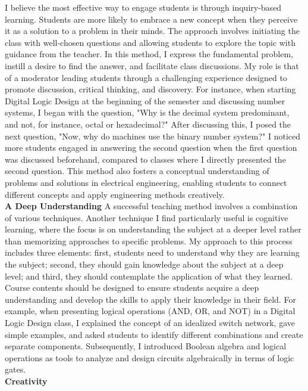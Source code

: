 I believe the most effective way to engage students is through inquiry-based learning. Students are more likely to embrace a new concept when they perceive it as a solution to a problem in their minds. The approach involves initiating the class with well-chosen questions and allowing students to explore the topic with guidance from the teacher. In this method, I express the fundamental problem, instill a desire to find the answer, and facilitate class discussions. My role is that of a moderator leading students through a challenging experience designed to promote discussion, critical thinking, and discovery. For instance, when starting Digital Logic Design at the beginning of the semester and discussing number systems, I began with the question, "Why is the decimal system predominant, and not, for instance, octal or hexadecimal?" After discussing this, I posed the next question, "Now, why do machines use the binary number system?" I noticed more students engaged in answering the second question when the first question was discussed beforehand, compared to classes where I directly presented the second question. This method also fosters a conceptual understanding of problems and solutions in electrical engineering, enabling students to connect different concepts and apply engineering methods creatively.
    \\[0.2cm]
   {\bf A Deep Understanding}
   A successful teaching method involves a combination of various techniques. Another technique I find particularly useful is cognitive learning, where the focus is on understanding the subject at a deeper level rather than memorizing approaches to specific problems. My approach to this process includes three elements: first, students need to understand why they are learning the subject; second, they should gain knowledge about the subject at a deep level; and third, they should contemplate the application of what they learned. Course contents should be designed to ensure students acquire a deep understanding and develop the skills to apply their knowledge in their field. For example, when presenting logical operations (AND, OR, and NOT) in a Digital Logic Design class, I explained the concept of an idealized switch network, gave simple examples, and asked students to identify different combinations and create separate components. Subsequently, I introduced Boolean algebra and logical operations as tools to analyze and design circuits algebraically in terms of logic gates.
    \\[0.2cm]
   {\bf Creativity}
